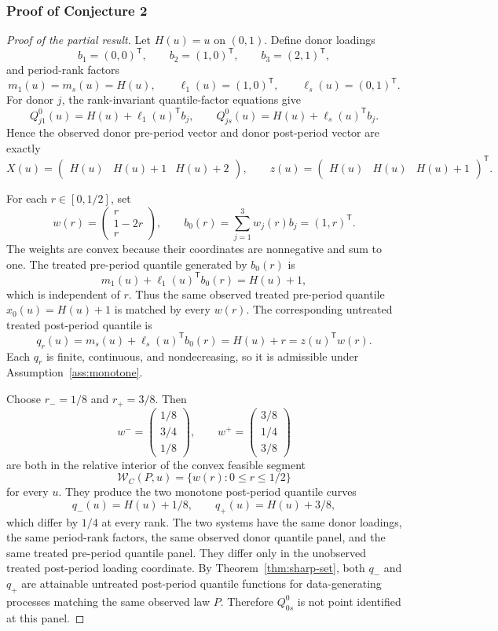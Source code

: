 \documentclass[11pt]{article}
\newcommand{\transpose}{\mathsf{T}}
\theoremstyle{definition}
\theoremstyle{plain}
\theoremstyle{remark}
\begin{document}
\subsubsection*{Proof of Conjecture 2}
\begin{proof}[Proof of the partial result]
Let \(H(u)=u\) on \((0,1)\).  Define donor loadings
\[
b_1=(0,0)^\transpose,\qquad b_2=(1,0)^\transpose,\qquad b_3=(2,1)^\transpose,
\]
and period-rank factors
\[
m_1(u)=m_s(u)=H(u),\qquad \ell_1(u)=(1,0)^\transpose,\qquad \ell_s(u)=(0,1)^\transpose .
\]
For donor \(j\), the rank-invariant quantile-factor equations give
\[
Q^0_{j1}(u)=H(u)+\ell_1(u)^\transpose b_j,\qquad
Q^0_{js}(u)=H(u)+\ell_s(u)^\transpose b_j.
\]
Hence the observed donor pre-period vector and donor post-period vector are exactly
\[
X(u)=\begin{pmatrix}H(u)&H(u)+1&H(u)+2\end{pmatrix},\qquad
z(u)=\begin{pmatrix}H(u)&H(u)&H(u)+1\end{pmatrix}^\transpose .
\]

For each \(r\in[0,1/2]\), set
\[
w(r)=\begin{pmatrix}r\\ 1-2r\\ r\end{pmatrix},\qquad b_0(r)=\sum_{j=1}^3 w_j(r)b_j=(1,r)^\transpose .
\]
The weights are convex because their coordinates are nonnegative and sum to one.  The treated pre-period quantile generated by \(b_0(r)\) is
\[
m_1(u)+\ell_1(u)^\transpose b_0(r)=H(u)+1,
\]
which is independent of \(r\).  Thus the same observed treated pre-period quantile \(x_0(u)=H(u)+1\) is matched by every \(w(r)\).  The corresponding untreated treated post-period quantile is
\[
q_r(u)=m_s(u)+\ell_s(u)^\transpose b_0(r)=H(u)+r=z(u)^\transpose w(r).
\]
Each \(q_r\) is finite, continuous, and nondecreasing, so it is admissible under Assumption~\ref{ass:monotone}.

Choose \(r_- =1/8\) and \(r_+=3/8\).  Then
\[
w^-=\begin{pmatrix}1/8\\3/4\\1/8\end{pmatrix},\qquad
w^+=\begin{pmatrix}3/8\\1/4\\3/8\end{pmatrix}
\]
are both in the relative interior of the convex feasible segment
\[
\mathcal{W}_C(P,u)=\{w(r):0\le r\le 1/2\}
\]
for every \(u\).  They produce the two monotone post-period quantile curves
\[
q_-(u)=H(u)+1/8,\qquad q_+(u)=H(u)+3/8,
\]
which differ by \(1/4\) at every rank.  The two systems have the same donor loadings, the same period-rank factors, the same observed donor quantile panel, and the same treated pre-period quantile panel.  They differ only in the unobserved treated post-period loading coordinate.  By Theorem~\ref{thm:sharp-set}, both \(q_-\) and \(q_+\) are attainable untreated post-period quantile functions for data-generating processes matching the same observed law \(P\).  Therefore \(Q^0_{0s}\) is not point identified at this panel.


\end{proof}
\end{document}
